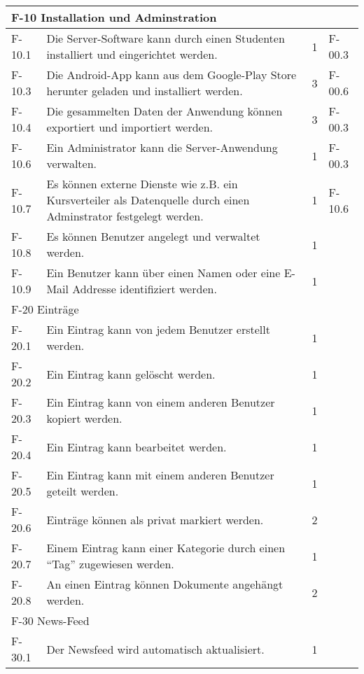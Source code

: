 \begin{tabularx}{\textwidth}{|l|X|l|l|}
    \multicolumn{4}{|l|}{F-10 Installation und Adminstration}\\
    \hline
    F-10.1 & Die Server-Software kann durch einen Studenten installiert und eingerichtet werden. & 1 & F-00.3 \\
    F-10.3 & Die Android-App kann aus dem Google-Play Store herunter geladen und installiert werden. & 3 & F-00.6\\
    F-10.4 & Die gesammelten Daten der Anwendung können exportiert und importiert werden. & 3 & F-00.3\\
    F-10.6 & Ein Administrator kann die Server-Anwendung verwalten. & 1 & F-00.3\\
    F-10.7 & Es können externe Dienste wie z.B. ein Kursverteiler als Datenquelle durch einen Adminstrator festgelegt werden. & 1 & F-10.6\\
    F-10.8 & Es können Benutzer angelegt und verwaltet werden. & 1 &\\
    F-10.9 & Ein Benutzer kann über einen Namen oder eine E-Mail Addresse identifiziert werden. & 1 &\\
    \hline
    \multicolumn{4}{|l|}{F-20 Einträge}\\
    \hline
    F-20.1 & Ein Eintrag kann von jedem Benutzer erstellt werden. & 1 & \\
    F-20.2 & Ein Eintrag kann gelöscht werden. & 1 & \\
    F-20.3 & Ein Eintrag kann von einem anderen Benutzer kopiert werden. & 1 & \\
    F-20.4 & Ein Eintrag kann bearbeitet werden. & 1 & \\
    F-20.5 & Ein Eintrag kann mit einem anderen Benutzer geteilt werden. & 1 & \\
    F-20.6 & Einträge können als privat markiert werden. & 2 &\\
    F-20.7 & Einem Eintrag kann einer Kategorie durch einen \enquote{Tag} zugewiesen werden. & 1 & \\
    F-20.8 & An einen Eintrag können Dokumente angehängt werden. & 2 & \\
    \hline
    \multicolumn{4}{|l|}{F-30 News-Feed}\\
    \hline
    F-30.1 & Der Newsfeed wird automatisch aktualisiert. & 1 & \\

\end{tabularx}
